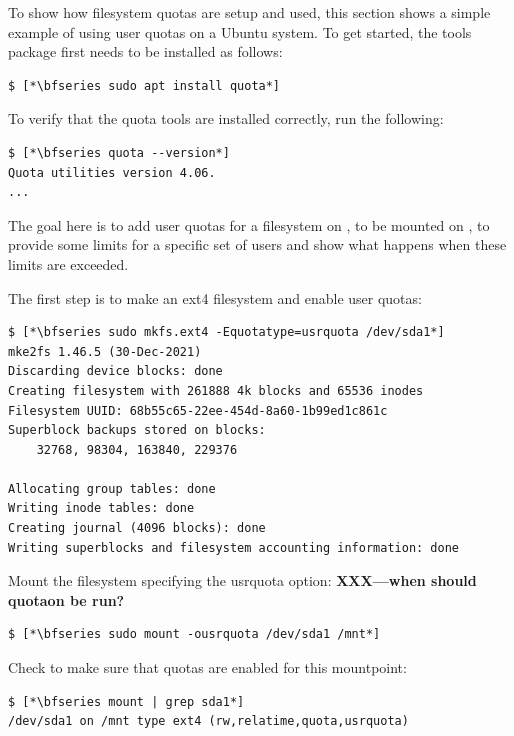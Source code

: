 To show how filesystem quotas are setup and used, this section shows a simple example of using user quotas on a Ubuntu system. To get started, the  tools package first needs to be installed as follows:

\begin{lstlisting}
$ [*\bfseries sudo apt install quota*]
\end{lstlisting}

\noindent 
To verify that the quota tools are installed correctly, run the following:

\begin{lstlisting}
$ [*\bfseries quota --version*]
Quota utilities version 4.06.
...
\end{lstlisting}

\noindent 
The goal here is to add user quotas for a filesystem on , to be mounted on , to provide some limits for a specific set of users and show what happens when these limits are exceeded.

The first step is to make an ext4 filesystem and enable user quotas:

\begin{lstlisting}
$ [*\bfseries sudo mkfs.ext4 -Equotatype=usrquota /dev/sda1*]
mke2fs 1.46.5 (30-Dec-2021)
Discarding device blocks: done                            
Creating filesystem with 261888 4k blocks and 65536 inodes
Filesystem UUID: 68b55c65-22ee-454d-8a60-1b99ed1c861c
Superblock backups stored on blocks: 
	32768, 98304, 163840, 229376

Allocating group tables: done                            
Writing inode tables: done                            
Creating journal (4096 blocks): done
Writing superblocks and filesystem accounting information: done
\end{lstlisting}

\noindent 
Mount the filesystem specifying the usrquota option: \textbf{XXX---when should quotaon be run?}

\begin{lstlisting}
$ [*\bfseries sudo mount -ousrquota /dev/sda1 /mnt*]
\end{lstlisting}

\noindent 
Check to make sure that quotas are enabled for this mountpoint:

\begin{lstlisting}
$ [*\bfseries mount | grep sda1*]
/dev/sda1 on /mnt type ext4 (rw,relatime,quota,usrquota)
\end{lstlisting}

